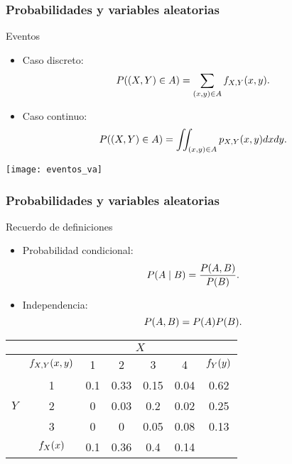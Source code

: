 \documentclass[table]{beamer}
\begin{document}
\begin{frame}
    \frametitle{Probabilidades y variables aleatorias}
    \begin{block}{Eventos}
        \begin{itemize}
            \item Caso discreto:
                \begin{equation*}
                    \prob{\parens{X, Y} \in A} = \sum_{\parens{x, y} \in A} \pff{X, Y}{x, y} .
                \end{equation*}
            \item Caso continuo:
                \begin{equation*}
                    \prob{\parens{X, Y} \in A} = \iint_{\parens{x, y} \in A} \ppdf{X, Y}{x, y} d x d y .
                \end{equation*}
        \end{itemize}
    \end{block}
    \begin{center}
        \texttt{[image: eventos\_va]}
    \end{center}
\end{frame}

\begin{frame}
    \frametitle{Probabilidades y variables aleatorias}
    \begin{block}{Recuerdo de definiciones}
        \begin{itemize}
            \item Probabilidad condicional:
                \begin{equation*}
                    \prob{A \mid B} = \frac{\prob{A, B}}{\prob{B}} .
                \end{equation*}
            \item Independencia:
                \begin{equation*}
                    \prob{A, B} = \prob{A} \prob{B} .
                \end{equation*}
        \end{itemize}
    \end{block}
    \begin{center}
        \small
        \begin{tabular}{c|c|cccc|c}
            & & \multicolumn{4}{c|}{$X$} & \\
            \hline
            & $\pff{X, Y}{x, y}$ & 1 & 2 & 3 & 4 & $\pff{Y}{y}$ \\
            \hline
            & 1 & 0.1 & 0.33 & 0.15 & 0.04 & 0.62 \\
            $Y$ & 2 & 0 & 0.03 & 0.2 & 0.02 & 0.25 \\
            & 3 & 0 & 0 & 0.05 & 0.08 & 0.13 \\
            \hline
            & $\pff{X}{x}$ & 0.1 & 0.36 & 0.4 & 0.14 &
        \end{tabular}
    \end{center}
   
\end{frame}
\end{document}
